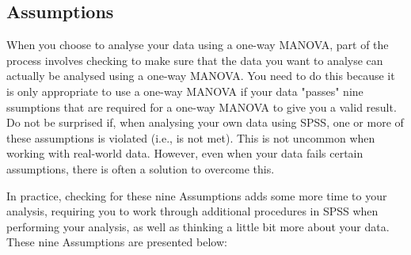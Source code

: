 \documentclass[12pt]{article} %
\begin{document}
\subsection{Assumptions}
When you choose to analyse your data using a one-way MANOVA, part of the process involves checking to make sure that the data you want to analyse can actually be analysed using a one-way MANOVA. You need to do this because it is only appropriate to use a one-way MANOVA if your data "passes" nine ssumptions that are required for a one-way MANOVA to give you a valid result. Do not be surprised if, when analysing your own data using SPSS, one or more of these assumptions is violated (i.e., is not met). This is not uncommon when working with real-world data. However, even when your data fails certain assumptions, there is often a solution to overcome this.

In practice, checking for these nine Assumptions adds some more time to your analysis, requiring you to work through additional procedures in SPSS when performing your analysis, as well as thinking a little bit more about your data. These nine Assumptions are presented below:
\end{document}
